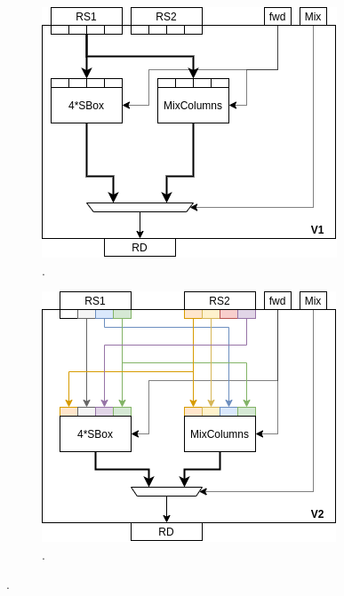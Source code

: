
\begin{figure}[t]
\centering
\begin{subfigure}[t]{0.40\textwidth}
    \centering
    \includegraphics[width=\textwidth]{diagrams/ise-datapath-v1.png}
    \caption{.}
    \label{fig:design:fu_block:v1}
\end{subfigure}
\begin{subfigure}[t]{0.40\textwidth}
    \centering
    \includegraphics[width=\textwidth]{diagrams/ise-datapath-v2.png}
    \caption{.}
    \label{fig:design:fu_block:v2}
\end{subfigure}


\end{figure}
